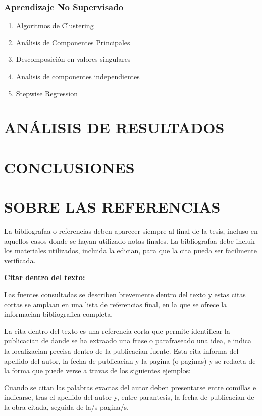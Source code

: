 \documentclass[spanish,12pt, a4paper,twoside]{paper}
\let\oldsection\section
\def\section{\cleardoublepage\oldsection}
\begin{document}
\subsubsection{Aprendizaje No Supervisado}
\begin{enumerate}
\item Algoritmos de Clustering
\item Análisis de Componentes Principales
\item Descomposición en valores singulares
\item Analisis de componentes independientes
\item Stepwise Regression
\end{enumerate}


\section{ANÁLISIS DE RESULTADOS}

\section{CONCLUSIONES}

\section{SOBRE LAS REFERENCIAS}

La bibliografaa o referencias deben aparecer siempre al final de la tesis, incluso en aquellos casos donde se hayan utilizado notas finales. La bibliografaa debe incluir los materiales utilizados, incluida la edician, para que la cita pueda ser facilmente verificada. 

\bigskip
{\bf Citar dentro del texto:}

Las fuentes consultadas se describen brevemente dentro del texto y estas citas cortas se amplaan en una lista de referencias final, en la que se ofrece la informacian bibliografica completa. 

La cita dentro del texto es una referencia corta que permite identificar la publicacian de dande se ha extraado una frase o parafraseado una idea, e indica la localizacian precisa dentro de la publicacian fuente. Esta cita informa del apellido del autor, la fecha de publicacian y la pagina (o paginas) y se redacta de la forma que puede verse a travas de los siguientes ejemplos:

Cuando se citan las palabras exactas del autor deben presentarse entre comillas e indicarse, tras el apellido del autor y, entre parantesis, la fecha de publicacian de la obra citada, seguida de la/s pagina/s.
\end{document}
